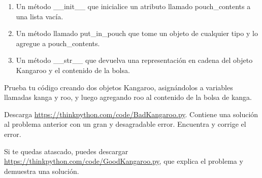 \begin{enumerate}
\item Un método \_\_init\_\_ que inicialice un atributo llamado pouch\_contents a una lista vacía.
\item Un método llamado put\_in\_pouch que tome un objeto de cualquier tipo y lo agregue a pouch\_contents.
\item Un método \_\_str\_\_ que devuelva una representación en cadena del objeto Kangaroo y el contenido de la bolsa.
\end{enumerate}

Prueba tu código creando dos objetos Kangaroo, asignándolos a variables llamadas kanga y roo, y luego agregando roo al contenido de la bolsa de kanga.

Descarga \url{https://thinkpython.com/code/BadKangaroo.py}. Contiene una solución al problema anterior con un gran y desagradable error. Encuentra y corrige el error.

Si te quedas atascado, puedes descargar \url{https://thinkpython.com/code/GoodKangaroo.py}, que explica el problema y demuestra una solución.